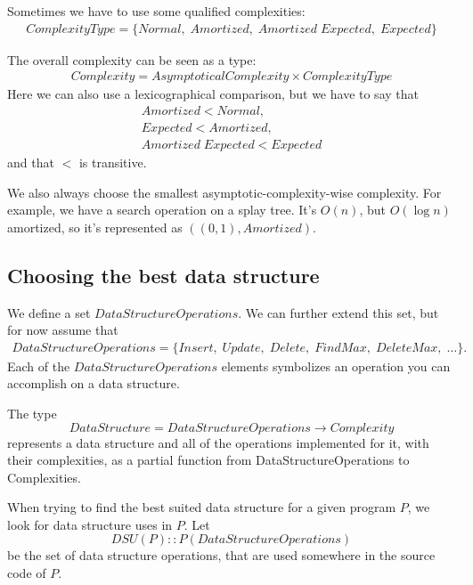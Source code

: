 \documentclass[11pt]{article}
\begin{document}
		Sometimes we have to use some qualified complexities:
		\begin{eqnarray}
			ComplexityType = \{ Normal, \; Amortized, \; Amortized \;Expected, \; Expected \}
		\end{eqnarray}

		The overall complexity can be seen as a type:
		\begin{eqnarray}
			Complexity = AsymptoticalComplexity \times ComplexityType
		\end{eqnarray}
		Here we can also use a lexicographical comparison, but we have to say that
		\begin{eqnarray}
			Amortized < Normal,\\
			Expected < Amortized,\\
			Amortized \; Expected < Expected
		\end{eqnarray}
		and that $<$ is transitive.

		We also always choose the smallest asymptotic-complexity-wise complexity.
		For example, we have a search operation on a splay tree. It's $O(n)$, but $O(\log n)$ amortized,
		so it's represented as $((0,1),Amortized)$.
	\subsection{Choosing the best data structure}
		We define a set $DataStructureOperations$. We can further extend this set, but for now assume that
		\begin{eqnarray}
		  	DataStructureOperations = \{Insert, \; Update, \; Delete, \; FindMax,\; DeleteMax, \; \dots\}.
		\end{eqnarray}
		Each of the $DataStructureOperations$ elements symbolizes an operation you can accomplish on a data structure.

		The type
		\begin{equation}\label{data-structure-type}
			DataStructure = DataStructureOperations \rightarrow Complexity
		\end{equation}
		represents a data structure and all of the operations implemented for it,
		with their complexities, as a partial function from DataStructureOperations to Complexities.

		When trying to find the best suited data structure for a given program $P$,
		we look for data structure uses in $P$. Let
		\begin{equation}\label{dsu-type}
			DSU(P) :: P(DataStructureOperations)
		\end{equation} be the set of data structure operations,
		that are used somewhere in the source code of $P$.
\end{document}
